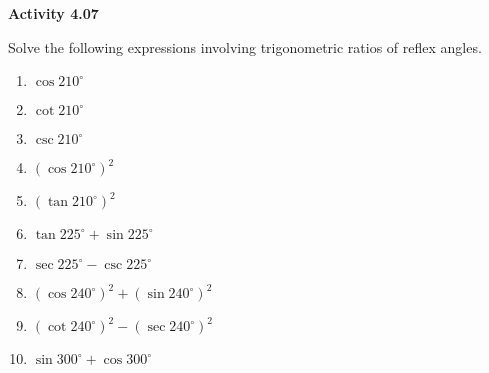 \vspace{0.3ex}
\noindent\textbf{Activity 4.07}

\vspace{0.2ex}

Solve the following expressions involving trigonometric ratios of reflex angles.
\begin{multicols}{2}
\begin{enumerate}
    \item \( \cos 210^\circ\)%
    \item \( \cot 210^\circ \)%
    \item \( \csc 210^\circ \)%
    \item \( (\cos 210^\circ)^2 \)%
    \item \( (\tan 210^\circ)^2 \)%
    \item \( \tan 225^\circ + \sin 225^\circ \)
    \item \( \sec 225^\circ - \csc 225^\circ \)
    \item \( (\cos 240^\circ)^2 + (\sin 240^\circ)^2 \)
    \item \( (\cot 240^\circ)^2 - (\sec 240^\circ)^2 \)
    \item \( \sin 300^\circ + \cos 300^\circ \)
\end{enumerate}
\end{multicols}
